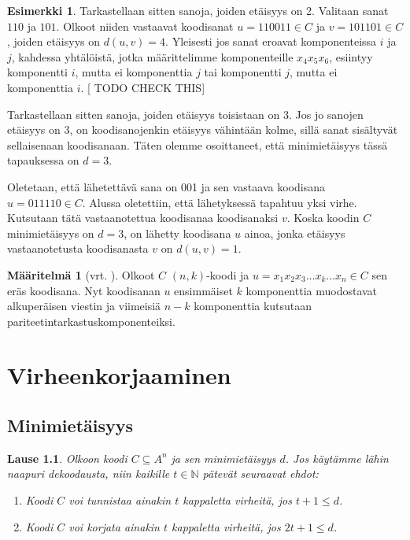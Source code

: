 \documentclass[a4paper,12pt,leqno,oneside]{report} %
\theoremstyle{plain}
\newtheorem{lause}{Lause}[chapter]
\theoremstyle{plain}
\theoremstyle{definition}
\newtheorem{maaritelma}{Määritelmä}[chapter]
\newtheorem{esimerkki}{Esimerkki}[chapter]
\theoremstyle{remark}
\numberwithin{equation}{chapter}
\newcommand*{\Nset}{\mathbb{N}}  %
\begin{document}
\begin{esimerkki}
        Tarkastellaan sitten sanoja, joiden etäisyys on 2. Valitaan sanat $110$ ja $101$. Olkoot niiden vastaavat koodisanat $u = 110011 \in C$ ja $v = 101101 \in C$, joiden etäisyys on $d(u, v) = 4$. Yleisesti jos sanat eroavat komponenteissa $i$ ja $j$, kahdessa yhtälöistä, jotka määrittelimme komponenteille $x_4x_5x_6$, esiintyy komponentti $i$, mutta ei komponenttia $j$ tai komponentti $j$, mutta ei komponenttia $i$. [ TODO CHECK THIS]

        Tarkastellaan sitten sanoja, joiden etäisyys toisistaan on 3. Jos jo sanojen etäisyys on 3, on koodisanojenkin etäisyys vähintään kolme, sillä sanat sisältyvät sellaisenaan koodisanaan. Täten olemme osoittaneet, että minimietäisyys tässä tapauksessa on $d = 3$.

        Oletetaan, että lähetettävä sana on 001 ja sen vastaava koodisana $u = 011110 \in C$.
        Alussa oletettiin, että lähetyksessä tapahtuu yksi virhe. Kutsutaan tätä vastaanotettua koodisanaa koodisanaksi $v$. Koska koodin $C$ minimietäisyys on $d = 3$, on lähetty koodisana $u$ ainoa, jonka etäisyys vastaanotetusta koodisanasta $v$ on $d(u,v) = 1$.
    \end{esimerkki}

    \begin{maaritelma}[vrt. {\cite[s.~494]{PA}}]\label{maar:nkkoodi}
        Olkoot $C$ $(n, k)$-koodi ja $u = x_1x_2x_3\dots x_k \dots x_n \in C$ sen eräs koodisana. Nyt koodisanan $u$ ensimmäiset $k$ komponenttia muodostavat alkuperäisen viestin ja viimeisiä $n-k$ komponenttia kutsutaan pariteetintarkastuskomponenteiksi.
    \end{maaritelma}

    \chapter{Virheenkorjaaminen}
    \section{Minimietäisyys}

    \begin{lause}\label{lause:nncorrection}
        Olkoon koodi $C \subseteq A^n$ ja sen minimietäisyys $d$. Jos käytämme lähin naapuri dekoodausta, niin kaikille $t \in \Nset$ pätevät seuraavat ehdot:
        \begin{enumerate}
            \item\label{kht:vtunnistus} Koodi $C$ voi tunnistaa ainakin $t$ kappaletta virheitä, jos $t + 1 \le d$.
            \item\label{kht:vkorjaus} Koodi $C$ voi korjata ainakin $t$ kappaletta virheitä, jos $2t + 1 \le d$.
        \end{enumerate}
    \end{lause}
\end{document}
